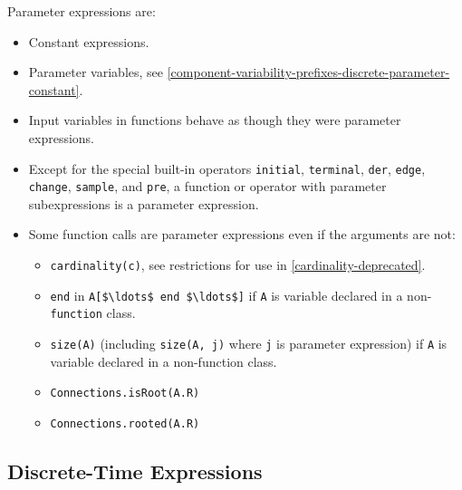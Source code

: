 Parameter expressions are:
\begin{itemize}
\item
  Constant expressions.
\item
  Parameter variables, see \cref{component-variability-prefixes-discrete-parameter-constant}.
\item
  Input variables in functions behave as though they were parameter expressions.
\item
  Except for the special built-in operators \lstinline!initial!, \lstinline!terminal!, \lstinline!der!,
  \lstinline!edge!, \lstinline!change!, \lstinline!sample!, and \lstinline!pre!, a function or operator with parameter
  subexpressions is a parameter expression.
\item
  Some function calls are parameter expressions even if the arguments are not:
  \begin{itemize}
  \item
    \lstinline!cardinality(c)!, see restrictions for use in \cref{cardinality-deprecated}.
  \item
    \lstinline!end! in \lstinline!A[$\ldots$ end $\ldots$]! if \lstinline!A! is variable declared in a non-\lstinline!function! class.
  \item
    \lstinline!size(A)! (including \lstinline!size(A, j)! where \lstinline!j! is parameter expression) if \lstinline!A! is variable declared in a non-function class.
  \item
    \lstinline!Connections.isRoot(A.R)!
  \item
    \lstinline!Connections.rooted(A.R)!
  \end{itemize}
\end{itemize}

\subsection{Discrete-Time Expressions}\label{discrete-time-expressions}

